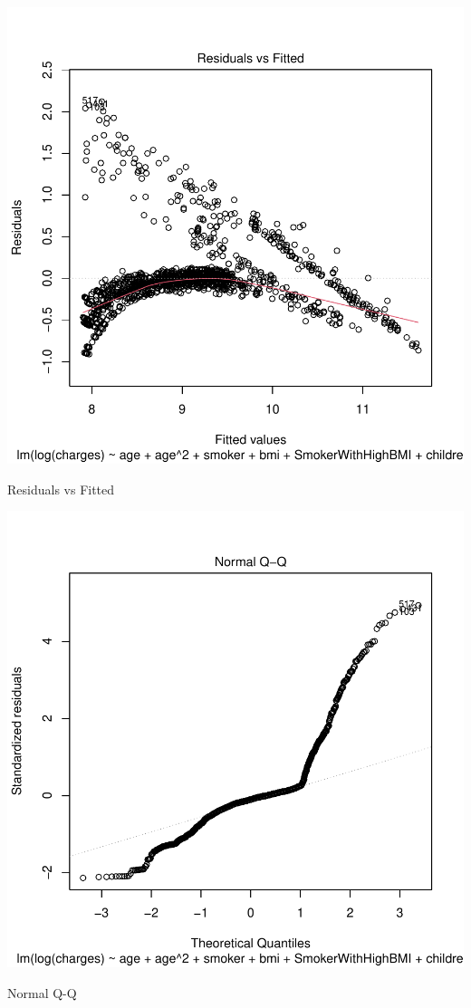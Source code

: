 \documentclass{article}
\begin{document}
\begin{centerfig}
\includegraphics{Untitled-065}
\caption{Residuals vs Fitted}
\end{centerfig}

\begin{centerfig}
\includegraphics{Untitled-066}
\caption{Normal Q-Q}
\end{centerfig}
\end{document}
